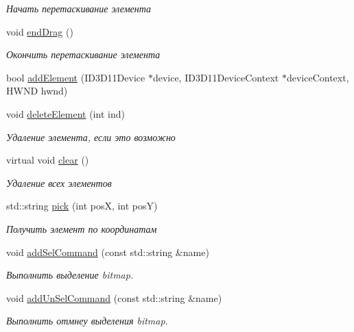 \begin{DoxyCompactItemize}
\begin{DoxyCompactList}\small\item\em Начать перетаскивание элемента \end{DoxyCompactList}\item 
void \hyperlink{class_group_element_class_aed915a4255b64767a847d058d9c7bc64}{end\+Drag} ()
\begin{DoxyCompactList}\small\item\em Окончить перетаскивание элемента \end{DoxyCompactList}\item 
bool \hyperlink{class_group_element_class_aa2a2b83ed4e4be2008cb632fdf6ecabf}{add\+Element} (I\+D3\+D11\+Device $\ast$device, I\+D3\+D11\+Device\+Context $\ast$device\+Context, H\+W\+ND hwnd)
\item 
void \hyperlink{class_group_element_class_a2543fd6cd553ed9804b888b42beb657b}{delete\+Element} (int ind)
\begin{DoxyCompactList}\small\item\em Удаление элемента, если это возможно \end{DoxyCompactList}\item 
virtual void \hyperlink{class_group_element_class_a162a930551375f92238a3d1604e05e6a}{clear} ()
\begin{DoxyCompactList}\small\item\em Удаление всех элементов \end{DoxyCompactList}\item 
std\+::string \hyperlink{class_group_element_class_aae9fb33c11d5273e33d7ad6dda5b3909}{pick} (int posX, int posY)
\begin{DoxyCompactList}\small\item\em Получить элемент по координатам \end{DoxyCompactList}\item 
void \hyperlink{class_group_element_class_a09a79779143779b0c6e5088bbdbed8ca}{add\+Sel\+Command} (const std\+::string \&name)
\begin{DoxyCompactList}\small\item\em Выполнить выделение bitmap. \end{DoxyCompactList}\item 
void \hyperlink{class_group_element_class_aa7a5120c46e4f73cbc818c2835b3e40a}{add\+Un\+Sel\+Command} (const std\+::string \&name)
\begin{DoxyCompactList}\small\item\em Выполнить отмнеу выделения bitmap. \end{DoxyCompactList}\item 

\end{DoxyCompactItemize}

